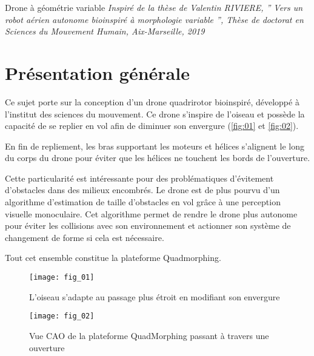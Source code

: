 
Drone à géométrie variable
\textit{Inspiré de la thèse de Valentin RIVIERE,
” Vers un robot aérien autonome bio­inspiré à morphologie variable ”,
Thèse de doctorat en Sciences du Mouvement Humain, Aix-­Marseille, 2019}

\section*{Présentation générale}


Ce sujet porte sur la conception d’un drone quadrirotor bio­inspiré, développé à l’institut des
sciences du mouvement. Ce drone s’inspire de l’oiseau et possède la capacité de se replier
en vol afin de diminuer son envergure (\autoref{fig:01} et \autoref{fig:02}).

En fin de repliement, les bras supportant les moteurs et hélices s’alignent le long du corps
du drone pour éviter que les hélices ne touchent les bords de l’ouverture.

Cette particularité est intéressante pour des problématiques d’évitement d’obstacles dans
des milieux encombrés. Le drone est de plus pourvu d’un algorithme d’estimation de taille
d’obstacles en vol grâce à une perception visuelle monoculaire. Cet algorithme permet de
rendre le drone plus autonome pour éviter les collisions avec son environnement et actionner
son système de changement de forme si cela est nécessaire.

Tout cet ensemble constitue la plateforme Quadmorphing.


\begin{minipage}[c]{.48\linewidth}
\begin{figure}[H]
\centering
\texttt{[image: fig\_01]}
\caption{\label{fig:01} L’oiseau s’adapte au passage
plus étroit en modifiant son envergure}
\end{figure}
\end{minipage}\hfill
\begin{minipage}[c]{.48\linewidth}
\begin{figure}[H]
\centering
\texttt{[image: fig\_02]}
\caption{\label{fig:02} Vue CAO de la plateforme QuadMorphing passant à travers une ouverture}
\end{figure}
\end{minipage}

